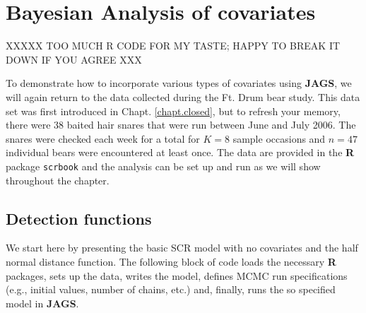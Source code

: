 \section{Bayesian Analysis of covariates}

XXXXX TOO MUCH R CODE FOR MY TASTE; HAPPY TO BREAK IT DOWN IF YOU AGREE XXX

To demonstrate how to incorporate various types of covariates using
{\bf JAGS}, we will again return to the data collected during the
Ft. Drum bear study.  This data set was first introduced in Chapt. \ref{chapt.closed},
but to refresh your memory, there were 38 baited hair snares that were run
between June and July 2006.  The snares were checked each week for a
total for $K=8$ sample occasions and $n=47$ individual bears were
encountered at least once.  The data are provided in the {\bf R}
package \mbox{\tt scrbook} and the analysis can be set up and run as
we will show throughout the chapter.

\subsection{Detection functions}

We start here by presenting the basic SCR model with no covariates and
the half normal distance function. The following block of code loads the necessary {\bf R} packages, sets up the data, writes the model, defines MCMC run specifications (e.g., initial values, number of chains, etc.) and, finally, runs the so specified model in {\bf JAGS}.  

